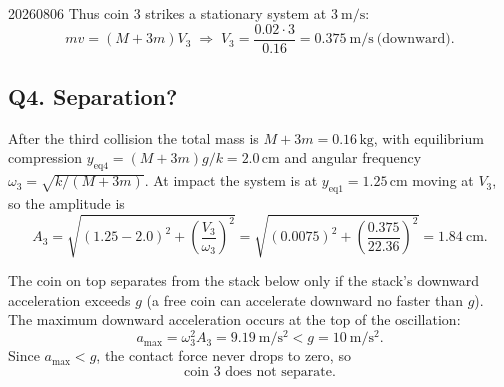 \begin{solution}{20260806}
Thus coin 3 strikes a stationary system at $3\ \mathrm{m/s}$:
\[
  m v = (M+3m) V_{3}
  \;\Longrightarrow\;
  V_{3} = \frac{0.02\cdot 3}{0.16} = \boxed{0.375\ \mathrm{m/s}\ \text{(downward)}}.
\]

\subsection*{Q4. Separation?}

After the third collision the total mass is $M+3m = 0.16\,\mathrm{kg}$, with equilibrium compression $y_{\text{eq}4} = (M+3m)g/k = 2.0\,\mathrm{cm}$ and angular frequency $\omega_{3} = \sqrt{k/(M+3m)}$.  At impact the system is at $y_{\text{eq}1} = 1.25\,\mathrm{cm}$ moving at $V_{3}$, so the amplitude is
\[
  A_{3} = \sqrt{(1.25-2.0)^{2} + \left(\frac{V_{3}}{\omega_{3}}\right)^{2}}
        = \sqrt{(0.0075)^{2} + \left(\frac{0.375}{22.36}\right)^{2}}
        = 1.84\ \mathrm{cm}.
\]

The coin on top separates from the stack below only if the stack's downward acceleration exceeds $g$ (a free coin can accelerate downward no faster than $g$).  The maximum downward acceleration occurs at the top of the oscillation:
\[
  a_{\max} = \omega_{3}^{2} A_{3} = 9.19\ \mathrm{m/s^{2}} < g = 10\ \mathrm{m/s^{2}}.
\]
Since $a_{\max} < g$, the contact force never drops to zero, so
\[
  \boxed{\text{coin 3 does not separate.}}
\]

\end{solution}


